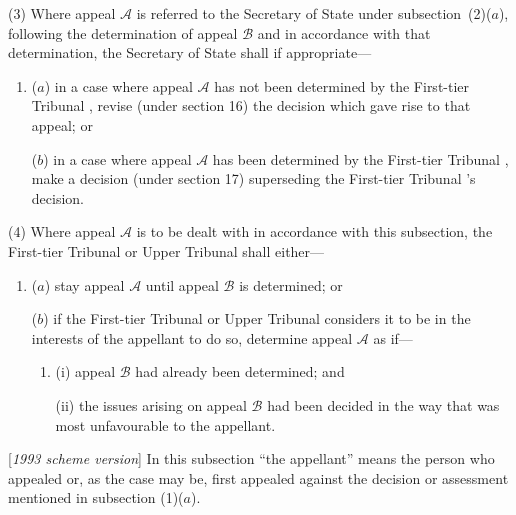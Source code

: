 \documentclass[12pt,a4paper]{article}
\begin{document}
(3) Where appeal $\mathcal{A}$ is referred to the 
Secretary of State  %
under subsection~(2)($a$), following the determination of appeal $\mathcal{B}$ and in accordance with that determination, 
the 
Secretary of State  %
shall if appropriate—
\begin{enumerate}\item[]
($a$) in a case where appeal $\mathcal{A}$ has not been determined by the 
First-tier Tribunal%
, revise (under section 16) 
the  %
decision which gave rise to that appeal; or

($b$) in a case where appeal $\mathcal{A}$ has been determined by the 
First-tier Tribunal%
, make a decision (under section 17) superseding the 
First-tier Tribunal%
’s decision.
\end{enumerate}

(4) Where appeal $\mathcal{A}$ is to be dealt with in accordance with this subsection, the 
First-tier Tribunal or Upper Tribunal  %
shall either—
\begin{enumerate}\item[]
($a$) stay appeal $\mathcal{A}$ until appeal $\mathcal{B}$ is determined; or

($b$) if the 
First-tier Tribunal or Upper Tribunal  %
considers it to be in the interests of the appellant to do so, determine appeal $\mathcal{A}$ as if—
\begin{enumerate}\item[]
(i) appeal $\mathcal{B}$ had already been determined; and

(ii) the issues arising on appeal $\mathcal{B}$ had been decided in the way that was most unfavourable to the appellant.
\end{enumerate}
\end{enumerate}

[\emph{1993 scheme version}] In this subsection “the appellant” means the person who appealed or, as the case may be, first appealed against the decision or assessment mentioned in subsection (1)($a$).
\end{document}

